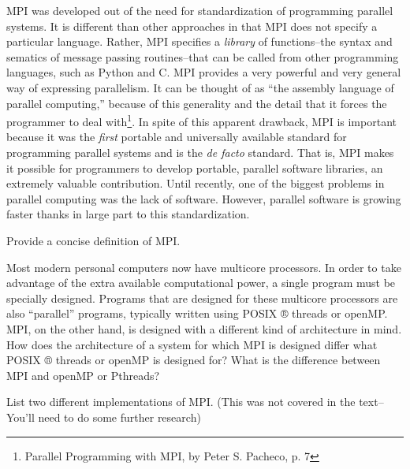     MPI was developed out of the need for standardization of programming parallel systems. It is different than other approaches in that MPI does not specify a particular language. Rather, MPI specifies a \emph{library} of functions--the syntax and sematics of message passing routines--that can be called from other programming languages, such as Python and C. MPI provides a very powerful and very general way of expressing parallelism. It can be thought of as ``the assembly language of parallel computing,'' because of this generality and the detail that it forces the programmer to deal with\footnote{
    Parallel Programming with MPI, by Peter S. Pacheco, p. 7
    }. In spite of this apparent drawback, MPI is important because it was the \emph{first} portable and universally available standard for programming parallel systems and is the \emph{de facto} standard. That is, MPI makes it possible for programmers to develop portable, parallel software libraries, an extremely valuable contribution.
    Until recently, one of the biggest problems in parallel computing was the lack of software. However, parallel software is growing faster thanks in large part to this standardization. 



    \begin{problem}
      Provide a concise definition of MPI.
    \end{problem}

    \begin{problem}
      Most modern personal computers now have multicore processors. In order to take advantage of the extra available computational power, a single program must be specially designed. Programs that are designed for these multicore processors are also ``parallel'' programs, typically written using POSIX ® threads or openMP. MPI, on the other hand, is designed with a different kind of architecture in mind. How does the architecture of a system for which MPI is designed differ what POSIX ® threads or openMP is designed for? What is the difference between MPI and openMP or Pthreads?
    \end{problem}

    \begin{problem}
      List two different implementations of MPI. (This was not covered in the text--You'll need to do some further research)
    \end{problem}

